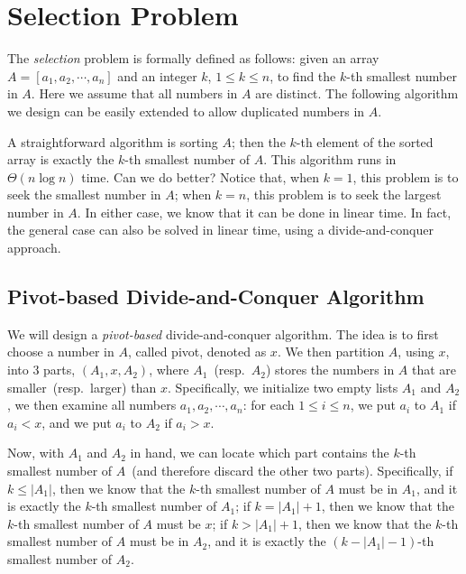 \setcounter{definition}{0} \setcounter{property}{0} \setcounter{claim}{0} \setcounter{fact}{0} \setcounter{corollary}{0} \setcounter{figure}{0}
\section{Selection Problem}

The \emph{selection} problem is formally defined as follows: given an array $A = [a_1,a_2, \cdots, a_n]$ and
an integer $k$, $1 \le k \le n$, to find the $k$-th smallest number in $A$.
Here we assume that all numbers in $A$ are distinct. The following algorithm
we design can be easily extended to allow duplicated numbers in $A$.

A straightforward algorithm is sorting $A$; then the $k$-th element of the sorted array is exactly
the $k$-th smallest number of $A$. This algorithm runs in $\Theta(n\log n)$ time. Can we do better?
Notice that, when $k = 1$, this problem is to seek the smallest number in $A$;
when $k = n$, this problem is to seek the largest number in $A$.
In either case, we know that it can be done in linear time.
In fact, the general case can also be solved in linear time, using a divide-and-conquer approach.

\subsection*{Pivot-based Divide-and-Conquer Algorithm}

We will design a \emph{pivot-based} divide-and-conquer algorithm.
The idea is to first choose a number in $A$, called pivot, denoted as $x$.
We then partition $A$, using $x$, into 3 parts, $(A_1, x, A_2)$, where $A_1$~(resp.\ $A_2$) stores the numbers in $A$
that are smaller~(resp.\ larger) than $x$.
Specifically, we initialize two empty lists $A_1$ and $A_2$,
we then examine all numbers $a_1, a_2, \cdots, a_n$: for each $1\le i \le n$, we put $a_i$ to $A_1$ if $a_i < x$,
and we put $a_i$ to $A_2$ if $a_i > x$.

Now, with $A_1$ and $A_2$ in hand, we can locate which part contains the $k$-th smallest number of $A$~(and therefore discard the other two parts).
Specifically, if $k \le |A_1|$, then we know that the $k$-th smallest number of $A$ must be in $A_1$,
and it is exactly the $k$-th smallest number of $A_1$;
if $k = |A_1| + 1$, then we know that the $k$-th smallest number of $A$ must be $x$;
if $k > |A_1| + 1$, then we know that the $k$-th smallest number of $A$ must be in $A_2$,
and it is exactly the $(k-|A_1|-1)$-th smallest number of $A_2$.

